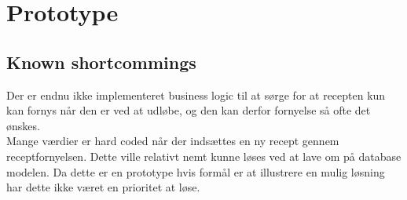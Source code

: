 \section{Prototype}




\subsection{Known shortcommings}
Der er endnu ikke implementeret business logic til at sørge for at recepten kun kan fornys når den er ved at udløbe, og den kan derfor fornyelse så ofte det ønskes.\\
Mange værdier er hard coded når der indsættes en ny recept gennem receptfornyelsen. Dette ville relativt nemt kunne løses ved at lave om på database modelen. Da dette er en prototype hvis formål er at illustrere en mulig løsning har dette ikke været en prioritet at løse. 